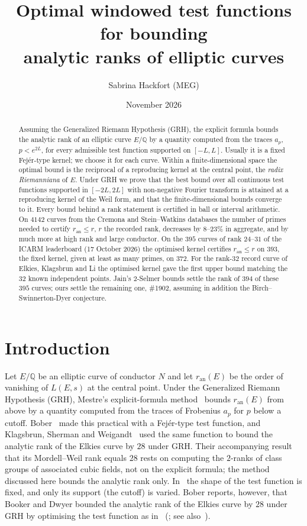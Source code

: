 \documentclass[11pt]{amsart}
\title[Optimal windowed test functions for analytic rank bounds]{Optimal windowed test functions for bounding\\ analytic ranks of elliptic curves}
\author{Sabrina Hackfort (MEG)}
\date{November 2026}
\renewcommand{\S}{\ensuremath{\mathsection}}
\theoremstyle{remark}
\theoremstyle{definition}
\newcommand{\Q}{\mathbb{Q}}
\newcommand{\ran}{r_{\mathrm{an}}}
\begin{document}
\begin{abstract}
Assuming the Generalized Riemann Hypothesis (GRH), the explicit formula bounds the analytic rank of an elliptic curve $E/\Q$ by a quantity computed from the traces $a_p$, $p<e^{2L}$, for every admissible test function supported on $[-L,L]$. Usually it is a fixed Fej\'er-type kernel; we choose it for each curve. Within a finite-dimensional space the optimal bound is the reciprocal of a reproducing kernel at the central point, the \emph{radix Riemanniana} of $E$. Under GRH we prove that the best bound over all continuous test functions supported in $[-2L,2L]$ with non-negative Fourier transform is attained at a reproducing kernel of the Weil form, and that the finite-dimensional bounds converge to it. Every bound behind a rank statement is certified in ball or interval arithmetic. On $4142$ curves from the Cremona and Stein--Watkins databases the number of primes needed to certify $\ran\le r$, $r$ the recorded rank, decreases by $8$--$23\%$ in aggregate, and by much more at high rank and large conductor. On the $395$ curves of rank $24$--$31$ of the ICARM leaderboard (17 October 2026) the optimised kernel certifies $\ran\le r$ on $393$, the fixed kernel, given at least as many primes, on $372$. For the rank-$32$ record curve of Elkies, Klagsbrun and Li the optimised kernel gave the first upper bound matching the $32$ known independent points. Jain's $2$-Selmer bounds settle the rank of $394$ of these $395$ curves; ours settle the remaining one, \#1902, assuming in addition the Birch--Swinnerton-Dyer conjecture.
\end{abstract}

\maketitle

\section{Introduction}

Let $E/\Q$ be an elliptic curve of conductor $N$ and let $\ran(E)$ be the order of vanishing of $L(E,s)$ at the central point. Under the Generalized Riemann Hypothesis (GRH), Mestre's explicit-formula method~\cite{Mestre} bounds $\ran(E)$ from above by a quantity computed from the traces of Frobenius $a_p$ for $p$ below a cutoff. Bober~\cite{Bober} made this practical with a Fej\'er-type test function, and Klagsbrun, Sherman and Weigandt~\cite{KSW} used the same function to bound the analytic rank of
the Elkies curve by $28$ under GRH. Their accompanying result that its Mordell--Weil rank equals $28$
rests on computing the $2$-ranks of class groups of associated cubic fields, not on the explicit
formula; the method discussed here bounds the analytic rank only. In~\cite{Bober,KSW} the shape of the test function is fixed, and only its support (the cutoff) is varied. Bober reports, however, that Booker and Dwyer bounded the analytic rank of the Elkies curve by $28$ under GRH by optimising the test function as in~\cite[\S3]{Booker} (\cite[Remark~1.2]{Bober}; see also~\cite[footnote~21]{Watkins}).
\end{document}
